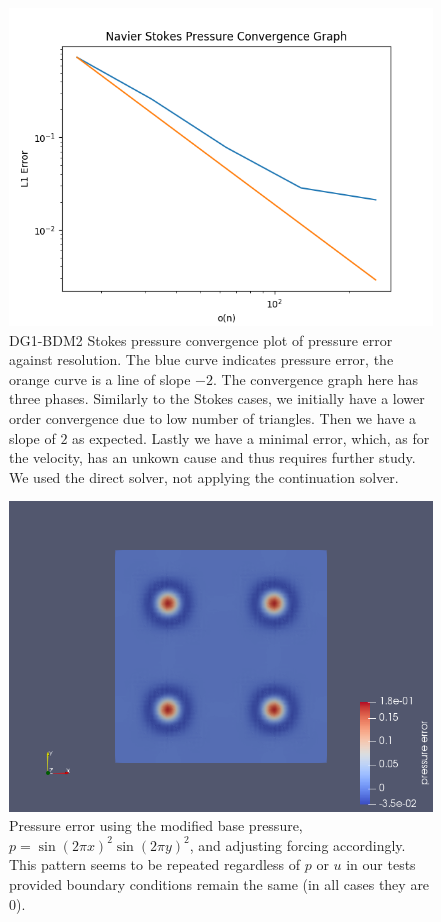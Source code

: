 \documentclass[11pt,twoside,a4paper]{article}
\begin{document}
\begin{figure}
\includegraphics[width=\linewidth]{navier_stokes_pressure_convergence_dbc0.png}
  \caption{DG1-BDM2 Stokes pressure convergence plot of pressure error against resolution. The blue curve indicates pressure error, the orange curve is a line of slope $-2$. The convergence graph here has three phases. Similarly to the Stokes cases, we initially have a lower order convergence due to low number of triangles. Then we have a slope of $2$ as expected. Lastly we have a minimal error, which, as for the velocity, has an unkown cause and thus requires further study. We used the direct solver, not applying the continuation solver.}
\end{figure}

\begin{figure}
  \includegraphics[width=\linewidth]{ns_fail_exp.png}
  \caption{Pressure error using the modified base pressure, $p = \sin(2 \pi x)^2 \sin(2 \pi y)^2$, and adjusting forcing accordingly. This pattern seems to be repeated regardless of $p$ or $u$ in our tests provided boundary conditions remain the same (in all cases they are $0$).}
\end{figure}
\end{document}
